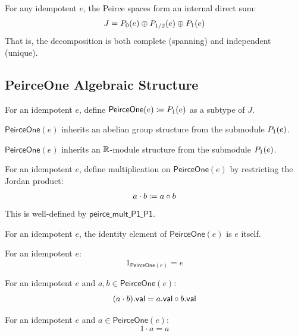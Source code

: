 \begin{theorem}
For any idempotent $e$, the Peirce spaces form an internal direct sum:
\[ J = \Peirce{e}{0} \oplus \Peirce{e}{1/2} \oplus \Peirce{e}{1} \]
That is, the decomposition is both complete (spanning) and independent (unique).
\end{theorem}

\subsection{PeirceOne Algebraic Structure}

\begin{definition}[PeirceOne]
For an idempotent $e$, define $\mathsf{PeirceOne}(e) \defas \Peirce{e}{1}$ as a subtype of $J$.
\end{definition}

\begin{proposition}[peirceOneAddCommGroup]
$\mathsf{PeirceOne}(e)$ inherits an abelian group structure from the submodule $\Peirce{e}{1}$.
\end{proposition}

\begin{proposition}[peirceOneModule]
$\mathsf{PeirceOne}(e)$ inherits an $\R$-module structure from the submodule $\Peirce{e}{1}$.
\end{proposition}

\begin{definition}[peirceOneMul]
For an idempotent $e$, define multiplication on $\mathsf{PeirceOne}(e)$ by restricting the Jordan product:
\[ a \cdot b \defas a \jmul b \]
This is well-defined by $\mathsf{peirce\_mult\_P1\_P1}$.
\end{definition}

\begin{definition}[peirceOneOne]
For an idempotent $e$, the identity element of $\mathsf{PeirceOne}(e)$ is $e$ itself.
\end{definition}

\begin{lemma}
For an idempotent $e$:
\[ 1_{\mathsf{PeirceOne}(e)} = e \]
\end{lemma}

\begin{lemma}
For an idempotent $e$ and $a, b \in \mathsf{PeirceOne}(e)$:
\[ (a \cdot b).\mathsf{val} = a.\mathsf{val} \jmul b.\mathsf{val} \]
\end{lemma}

\begin{theorem}
For an idempotent $e$ and $a \in \mathsf{PeirceOne}(e)$:
\[ 1 \cdot a = a \]
\end{theorem}

